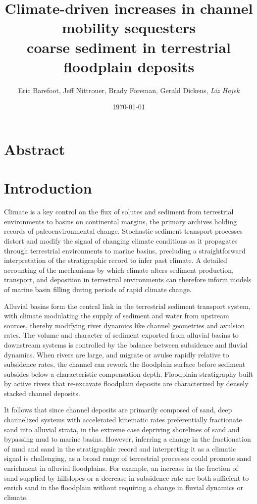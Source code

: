 \documentclass[draft]{compact_proposal}
\title{Climate-driven increases in channel mobility sequesters \\ coarse sediment in terrestrial floodplain deposits}
\author{Eric Barefoot, Jeff Nittrouer, Brady Foreman, Gerald Dickens, \textit{Liz Hajek}}
\date{\today}
\begin{document}
\maketitle


\section{Abstract}

\section{Introduction}

Climate is a key control on the flux of solutes and sediment from terrestrial environments to basins on continental margins, the primary archives holding records of paleoenvironmental change.
Stochastic sediment transport processes distort and modify the signal of changing climate conditions as it propagates through terrestrial environments to marine basins, precluding a straightforward interpretation of the stratigraphic record to infer past climate.
A detailed accounting of the mechanisms by which climate alters sediment production, transport, and deposition in terrestrial environments can therefore inform models of marine basin filling during periods of rapid climate change.

Alluvial basins form the central link in the terrestrial sediment transport system, with climate modulating the supply of sediment and water from upstream sources, thereby modifying river dynamics like channel geometries and avulsion rates. 
The volume and character of sediment exported from alluvial basins to downstream systems is controlled by the balance between subsidence and fluvial dynamics.
When rivers are large, and migrate or avulse rapidly relative to subsidence rates, the channel can rework the floodplain surface before sediment subsides below a characteristic compensation depth.
Floodplain stratigraphy built by active rivers that re-excavate floodplain deposits are characterized by densely stacked channel deposits.

It follows that since channel deposits are primarily composed of sand, deep channelized systems with accelerated kinematic rates preferentially fractionate sand into alluvial strata, in the extreme case depriving shorelines of sand and bypassing mud to marine basins.
However, inferring a change in the fractionation of mud and sand in the stratigraphic record and interpreting it as a climatic signal is challenging, as a broad range of terrestrial processes could promote sand enrichment in alluvial floodplains.
For example, an increase in the fraction of sand supplied by hillslopes or a decrease in subsidence rate are both sufficient to enrich sand in the floodplain without requiring a change in fluvial dynamics or climate.
\end{document}

